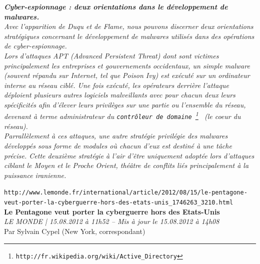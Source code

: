 \documentclass[11pt,twoside,a4paper]{article}
\begin{document}
\textbf{\emph{\large Cyber-espionnage : deux orientations dans le d{\'e}veloppement de malwares. }}~\\

\emph{Avec l'apparition de Duqu et de Flame, nous pouvons discerner deux orientations strat{\'e}giques concernant le d{\'e}veloppement de malwares utilis{\'e}s dans des op{\'e}rations de cyber-espionnage.}~\\

\emph{Lors d'attaques APT (Advanced Persistent Threat) dont sont victimes principalement les entreprises et gouvernements occidentaux, un simple malware (souvent r{\'e}pandu sur Internet, tel que Poison Ivy) est ex{\'e}cut{\'e} sur un ordinateur interne au r{\'e}seau cibl{\'e}. Une fois ex{\'e}cut{\'e}, les op{\'e}rateurs derri{\`e}re l'attaque d{\'e}ploient plusieurs autres logiciels malveillants avec pour chacun deux leurs sp{\'e}cificit{\'e}s afin d'{\'e}lever leurs privil{\`e}ges sur une partie ou l'ensemble du r{\'e}seau, devenant {\`a} terme administrateur du \texttt{contr{\^o}leur de domaine~\footnote{\texttt{http://fr.wikipedia.org/wiki/Active\_Directory}} } (le coeur du r{\'e}seau).}~\\

\emph{Parrall{\`e}lement {\`a} ces attaques, une autre strat{\'e}gie privil{\'e}gie des malwares d{\'e}velopp{\'e}s sous forme de modules o{\`u} chacun d'eux est destin{\'e} {\`a} une t{\^a}che pr{\'e}cise. Cette deuxi{\`e}me strat{\'e}gie {\`a} l'air d'{\^e}tre uniquement adopt{\'e}e lors d'attaques ciblant le Moyen et le Proche Orient, th{\'e}{\^a}tre de conflits li{\'e}s principalement {\`a} la puissance iranienne.}~\\

\clearpage

\texttt{http://www.lemonde.fr/international/article/2012/08/15/le-pentagone-veut-porter-la-cyberguerre-hors-des-etats-unis\_1746263\_3210.html}~\\

\textbf{\LARGE Le Pentagone veut porter la cyberguerre hors des Etats-Unis}~\\

\emph{\small LE MONDE | 15.08.2012 {\`a} 11h52 -- Mis {\`a} jour le 15.08.2012 {\`a} 14h08}~\\

Par Sylvain Cypel (New York, correspondant)~\\
\end{document}
